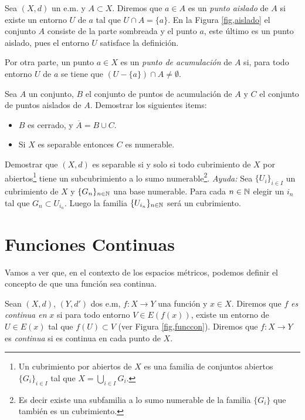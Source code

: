 \begin{ejercicio}{} Sea $(X,d)$ un e.m. y $A\subset X$. Diremos que
$a\in A$ es un \emph{punto aislado} de $A$ si existe un entorno
$U$ de $a$ tal que $U\cap A=\{a\}$. En la Figura
\vref{fig,aislado} el conjunto $A$ consiste de la parte sombreada
y el punto $a$, este último es un punto aislado, pues el entorno
$U$ satisface la definición.




Por otra parte, un punto $a\in X$ es un \emph{punto de
acumulación} de $A$ si, para todo entorno $U$ de $a$ se tiene
que $(U-\{a\})\cap A\neq\emptyset$.

Sea $A$ un conjunto, $B$ el conjunto de puntos de acumulación de
$A$ y $C$ el conjunto de puntos aislados de $A$. Demostrar los
siguientes items:
\begin{itemize}
    \item[a)] $B$ es cerrado, y $\overline{A}=B\cup C$.
    \item[b)] Si $X$ es separable entonces $C$ es numerable.
\end{itemize}
\end{ejercicio}
\begin{ejercicio}{} Demostrar que $(X,d)$ es separable si y solo si
 todo cubrimiento de $X$ por abiertos\footnote{Un cubrimiento por
abiertos de $X$ es una familia de conjuntos abiertos
$\{G_i\}_{i\in I}$ tal que $X=\bigcup_{i\in I}G_i$.} tiene un
subcubrimiento a lo sumo numerable\footnote{Es decir existe una
subfamilia a lo sumo numerable de la familia $\{G_i\}$ que
también es un cubrimiento.}. \emph{Ayuda:} Sea $\{U_i\}_{i\in
I}$ un cubrimiento de $X$ y $\{G_n\}_{n\in\mathbb{N}}$ una base
numerable. Para cada $n\in\mathbb{N}$ elegir un $i_n$ tal que $G_n\subset
U_{i_n}$. Luego la familia $\{U_{i_n}\}_{n\in\mathbb{N}}$ será un
cubrimiento.
\end{ejercicio}



\section{Funciones Continuas}
Vamos a ver que, en el contexto de los espacios métricos,
podemos definir el concepto de que una función sea continua.

\begin{definicion}{} Sean $(X,d)$, $(Y,d')$ dos e.m, $f:X\rightarrow
Y$ una función y $x\in X$.
Diremos que $f$ \emph{es continua en}
$x$ si para todo entorno  $V\in E(f(x))$, existe un entorno de
$U\in E(x)$ tal que $f(U)\subset V$ (ver Figura
\vref{fig,funccon}). Diremos que $f:X\rightarrow Y$ es
\emph{continua} si es continua en cada punto de $X$.
\end{definicion}



